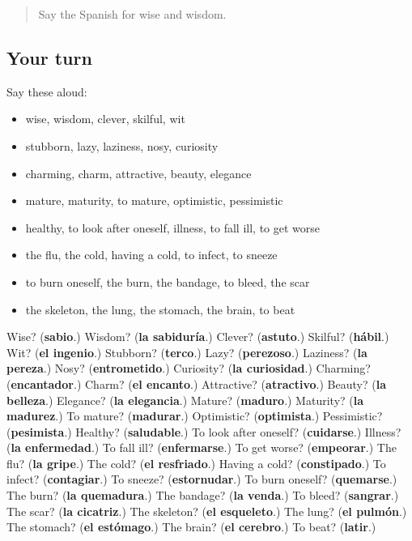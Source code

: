 \label{lesson:ES-R735-repaso-728-735}



\begin{quote}
Say the Spanish for wise and wisdom.
\end{quote}

\subsection*{Your turn}
Say these aloud:

\begin{itemize}
\raggedright
  \item wise, wisdom, clever, skilful, wit
  \item stubborn, lazy, laziness, nosy, curiosity
  \item charming, charm, attractive, beauty, elegance
  \item mature, maturity, to mature, optimistic, pessimistic
  \item healthy, to look after oneself, illness, to fall ill, to get worse
  \item the flu, the cold, having a cold, to infect, to sneeze
  \item to burn oneself, the burn, the bandage, to bleed, the scar
  \item the skeleton, the lung, the stomach, the brain, to beat
\end{itemize}

\begin{tcolorbox}[breakable,colback=teal!4,colframe=teal!35!black,title={Before you move on}]
Wise? (\textbf{sabio}.) Wisdom? (\textbf{la sabiduría}.) Clever? (\textbf{astuto}.) Skilful? (\textbf{hábil}.) Wit? (\textbf{el ingenio}.) Stubborn? (\textbf{terco}.) Lazy? (\textbf{perezoso}.) Laziness? (\textbf{la pereza}.) Nosy? (\textbf{entrometido}.) Curiosity? (\textbf{la curiosidad}.) Charming? (\textbf{encantador}.) Charm? (\textbf{el encanto}.) Attractive? (\textbf{atractivo}.) Beauty? (\textbf{la belleza}.) Elegance? (\textbf{la elegancia}.) Mature? (\textbf{maduro}.) Maturity? (\textbf{la madurez}.) To mature? (\textbf{madurar}.) Optimistic? (\textbf{optimista}.) Pessimistic? (\textbf{pesimista}.) Healthy? (\textbf{saludable}.) To look after oneself? (\textbf{cuidarse}.) Illness? (\textbf{la enfermedad}.) To fall ill? (\textbf{enfermarse}.) To get worse? (\textbf{empeorar}.) The flu? (\textbf{la gripe}.) The cold? (\textbf{el resfriado}.) Having a cold? (\textbf{constipado}.) To infect? (\textbf{contagiar}.) To sneeze? (\textbf{estornudar}.) To burn oneself? (\textbf{quemarse}.) The burn? (\textbf{la quemadura}.) The bandage? (\textbf{la venda}.) To bleed? (\textbf{sangrar}.) The scar? (\textbf{la cicatriz}.) The skeleton? (\textbf{el esqueleto}.) The lung? (\textbf{el pulmón}.) The stomach? (\textbf{el estómago}.) The brain? (\textbf{el cerebro}.) To beat? (\textbf{latir}.)
\end{tcolorbox}
